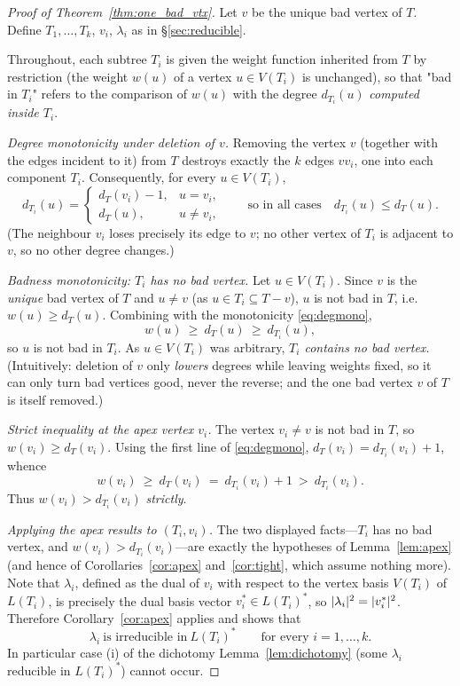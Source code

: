 \begin{proof}[Proof of Theorem~\ref{thm:one_bad_vtx}]
Let $v$ be the unique bad vertex of $T$.  Define $T_1,\dots,T_k$, $v_i$, $\lambda_i$ as in
\S\ref{sec:reducible}.

Throughout, each subtree $T_i$ is given the weight function inherited from $T$ by restriction
(the weight $w(u)$ of a vertex $u\in V(T_i)$ is unchanged), so that "bad in $T_i$" refers to
the comparison of $w(u)$ with the degree $d_{T_i}(u)$ \emph{computed inside $T_i$}.

\smallskip\noindent\emph{Degree monotonicity under deletion of $v$.}
Removing the vertex $v$ (together with the edges incident to it) from $T$ destroys exactly the
$k$ edges $v v_i$, one into each component $T_i$.  Consequently, for every $u\in V(T_i)$,
\begin{equation}
\label{eq:degmono}
d_{T_i}(u)=\begin{cases} d_T(v_i)-1, & u=v_i,\\[2pt] d_T(u), & u\ne v_i,\end{cases}
\qquad\text{so in all cases}\quad d_{T_i}(u)\le d_T(u).
\end{equation}
(The neighbour $v_i$ loses precisely its edge to $v$; no other vertex of $T_i$ is adjacent to
$v$, so no other degree changes.)

\smallskip\noindent\emph{Badness monotonicity: $T_i$ has no bad vertex.}
Let $u\in V(T_i)$.  Since $v$ is the \emph{unique} bad vertex of $T$ and $u\ne v$ (as
$u\in T_i\subseteq T-v$), $u$ is not bad in $T$, i.e. $w(u)\ge d_T(u)$.  Combining with the
monotonicity \eqref{eq:degmono},
\[
w(u)\ \ge\ d_T(u)\ \ge\ d_{T_i}(u),
\]
so $u$ is not bad in $T_i$.  As $u\in V(T_i)$ was arbitrary, \emph{$T_i$ contains no bad
vertex.}  (Intuitively: deletion of $v$ only \emph{lowers} degrees while leaving weights
fixed, so it can only turn bad vertices good, never the reverse; and the one bad vertex $v$
of $T$ is itself removed.)

\smallskip\noindent\emph{Strict inequality at the apex vertex $v_i$.}
The vertex $v_i\ne v$ is not bad in $T$, so $w(v_i)\ge d_T(v_i)$.  Using the first line of
\eqref{eq:degmono}, $d_T(v_i)=d_{T_i}(v_i)+1$, whence
\begin{equation}
\label{eq:strictvi}
w(v_i)\ \ge\ d_T(v_i)\ =\ d_{T_i}(v_i)+1\ >\ d_{T_i}(v_i).
\end{equation}
Thus $w(v_i)>d_{T_i}(v_i)$ \emph{strictly}.

\smallskip\noindent\emph{Applying the apex results to $(T_i,v_i)$.}
The two displayed facts---$T_i$ has no bad vertex, and $w(v_i)>d_{T_i}(v_i)$---are exactly the
hypotheses of Lemma~\ref{lem:apex} (and hence of Corollaries~\ref{cor:apex} and~\ref{cor:tight},
which assume nothing more).  Note that $\lambda_i$, defined as the dual of $v_i$ with respect
to the vertex basis $V(T_i)$ of $L(T_i)$, is precisely the dual basis vector
$v_i^\ast\in L(T_i)^\ast$, so $\lvert \lambda_i\rvert^{2}=\lvert v_i^\ast\rvert^{2}$.  Therefore
Corollary~\ref{cor:apex} applies and shows that
\[
\lambda_i\ \text{is irreducible in}\ L(T_i)^\ast\qquad\text{for every }i=1,\dots,k.
\]
In particular case \textup{(i)} of the dichotomy Lemma~\ref{lem:dichotomy} (some $\lambda_i$
reducible in $L(T_i)^\ast$) cannot occur.


\end{proof}
